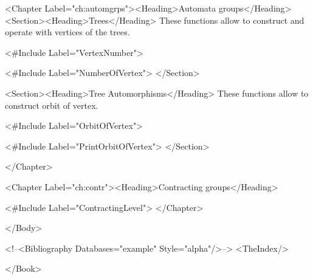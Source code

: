   \TableOfContents
  \FrontMatter
  \Chapters
  \Appendices
    \Index
\EndOfBook




<Chapter Label="ch:automgrps"><Heading>Automata groups</Heading>
 <Section><Heading>Trees</Heading>
 These functions allow to construct and operate with vertices of the trees.

 <#Include Label="VertexNumber">

 <#Include Label="NumberOfVertex">
 </Section>

 <Section><Heading>Tree Automorphisms</Heading>
 These functions allow to construct orbit of vertex.

 <#Include Label="OrbitOfVertex">

 <#Include Label="PrintOrbitOfVertex">
 </Section>

</Chapter>


<Chapter Label="ch:contr"><Heading>Contracting groups</Heading>

 <#Include Label="ContractingLevel">
</Chapter>

</Body>


<!--<Bibliography Databases="example" Style="alpha"/>-->
<TheIndex/>

</Book>
